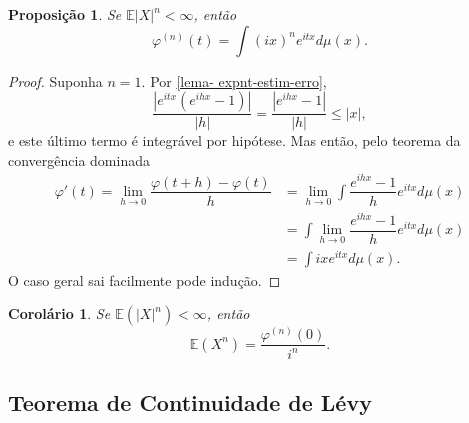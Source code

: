 \documentclass[12pt,a4paper,oneside]{book}
\newtheorem{proposition}[theorem]{Proposi\c{c}\~ao}
\newtheorem{corollary}[theorem]{Corol\'ario}
\theoremstyle{definition}
\theoremstyle{remark}
\numberwithin{equation}{section}
\newcommand{\E}{\mathbb{E}}
\begin{document}
\begin{proposition}
Se $\E|X|^n <\infty$, então
$$\varphi^{(n)}(t) = \int (ix)^n e^{itx}d\mu(x). $$ 
\end{proposition}

\begin{proof}
Suponha $n=1.$ Por \ref{lema- expnt-estim-erro},
$$\dfrac{|e^{itx}(e^{ihx} - 1)|}{|h|} =  \dfrac{|e^{ihx} - 1|}{|h|}\leq |x|, $$
e este último termo é integrável por hipótese. Mas então, pelo teorema da convergência dominada
\begin{align*}
\varphi'(t) = \lim_{h\rightarrow 0}\dfrac{\varphi(t+h)-\varphi(t)}{h} & = \lim_{h\rightarrow 0}\int \dfrac{e^{ihx}-1}{h} e^{itx} d\mu(x) \\
& = \int \lim_{h\rightarrow 0}\dfrac{e^{ihx}-1}{h} e^{itx} d\mu(x) \\
& = \int ix e^{itx}d\mu(x).
\end{align*}
O caso geral sai facilmente pode indução.
\end{proof}

\begin{corollary}
Se $\E(|X|^n)<\infty$, então
$$\E(X^n) = \dfrac{\varphi^{(n)}(0)}{i^n}. $$
\end{corollary}







\subsection{Teorema de Continuidade de Lévy}
\end{document}
